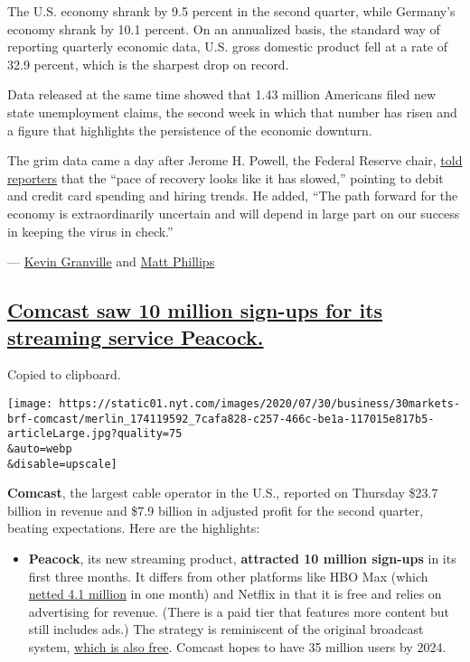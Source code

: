 The U.S. economy shrank by 9.5 percent in the second quarter, while
Germany's economy shrank by 10.1 percent. On an annualized basis, the
standard way of reporting quarterly economic data, U.S. gross domestic
product fell at a rate of 32.9 percent, which is the sharpest drop on
record.

Data released at the same time showed that 1.43 million Americans filed
new state unemployment claims, the second week in which that number has
risen and a figure that highlights the persistence of the economic
downturn.

The grim data came a day after Jerome H. Powell, the Federal Reserve
chair,
\href{https://www.nytimes.com/2020/07/29/business/economy/federal-reserve-meeting-interest-rates.html}{told
reporters} that the ``pace of recovery looks like it has slowed,''
pointing to debit and credit card spending and hiring trends. He added,
``The path forward for the economy is extraordinarily uncertain and will
depend in large part on our success in keeping the virus in check.''

--- \href{https://www.nytimes.com/by/kevin-granville}{Kevin Granville}
and \href{https://www.nytimes.com/by/matt-phillips}{Matt Phillips}

\hypertarget{comcast-saw-10-million-sign-ups-for-its-streaming-service-peacock}{%
\subsection{\texorpdfstring{\protect\hyperlink{comcast-saw-10-million-sign-ups-for-its-streaming-service-peacock}{Comcast
saw 10 million sign-ups for its streaming service
Peacock.}}{Comcast saw 10 million sign-ups for its streaming service Peacock.}}\label{comcast-saw-10-million-sign-ups-for-its-streaming-service-peacock}}

Copied to clipboard.

\texttt{[image: https://static01.nyt.com/images/2020/07/30/business/30markets-brf-comcast/merlin\_174119592\_7cafa828-c257-466c-be1a-117015e817b5-articleLarge.jpg?quality=75\\\&auto=webp\\\&disable=upscale]}

\textbf{Comcast}, the largest cable operator in the U.S., reported on
Thursday \$23.7 billion in revenue and \$7.9 billion in adjusted profit
for the second quarter, beating expectations. Here are the highlights:

\begin{itemize}
\tightlist
\item
  \textbf{Peacock}, its new streaming product, \textbf{attracted 10
  million sign-ups} in its first three months. It differs from other
  platforms like HBO Max (which
  \href{https://www.nytimes.com/2020/07/23/business/media/att-hbo-max.html}{netted
  4.1 million} in one month) and Netflix in that it is free and relies
  on advertising for revenue. (There is a paid tier that features more
  content but still includes ads.) The strategy is reminiscent of the
  original broadcast system,
  \href{https://www.nytimes.com/2019/01/31/business/locast-streaming-free-network-tv.html}{which
  is also free}. Comcast hopes to have 35 million users by 2024.
\end{itemize}

